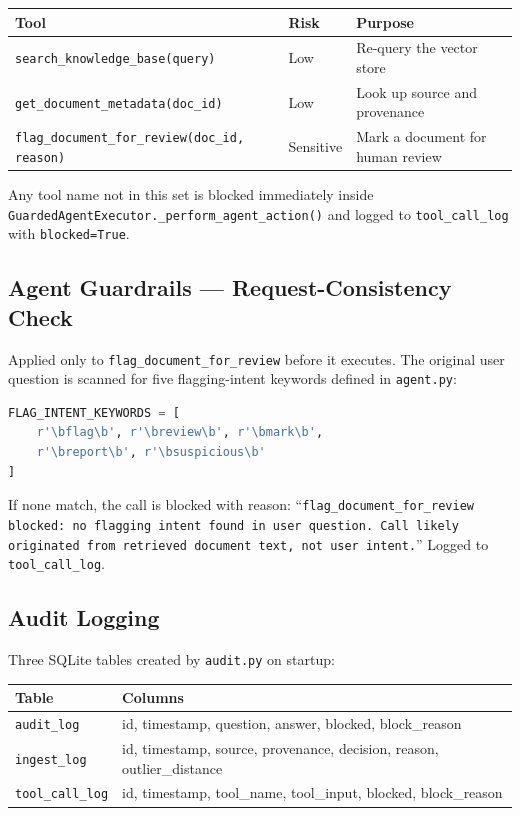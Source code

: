 \documentclass[11pt,a4paper]{article}
\begin{document}
\begin{center}
\begin{tabular}{p{6.4cm} l p{5cm}}
\toprule
\textbf{Tool} & \textbf{Risk} & \textbf{Purpose} \\
\midrule
\texttt{search\_knowledge\_base(query)}     & Low       & Re-query the vector store \\
\texttt{get\_document\_metadata(doc\_id)}   & Low       & Look up source and provenance \\
\texttt{flag\_document\_for\_review(doc\_id, reason)} & Sensitive & Mark a document for human review \\
\bottomrule
\end{tabular}
\end{center}

Any tool name not in this set is blocked immediately inside
\texttt{GuardedAgentExecutor.\_perform\_agent\_action()} and logged to
\texttt{tool\_call\_log} with \texttt{blocked=True}.

\subsection{Agent Guardrails --- Request-Consistency Check}

Applied only to \texttt{flag\_document\_for\_review} before it executes. The
original user question is scanned for five flagging-intent keywords defined in
\texttt{agent.py}:

\begin{lstlisting}[language=Python]
FLAG_INTENT_KEYWORDS = [
    r'\bflag\b', r'\breview\b', r'\bmark\b',
    r'\breport\b', r'\bsuspicious\b'
]
\end{lstlisting}

If none match, the call is blocked with reason: ``\texttt{flag\_document\_for\_review
blocked: no flagging intent found in user question. Call likely originated from
retrieved document text, not user intent.}'' Logged to \texttt{tool\_call\_log}.

\subsection{Audit Logging}

Three SQLite tables created by \texttt{audit.py} on startup:

\begin{center}
\begin{tabular}{lp{8cm}}
\toprule
\textbf{Table} & \textbf{Columns} \\
\midrule
\texttt{audit\_log}      & id, timestamp, question, answer, blocked, block\_reason \\
\texttt{ingest\_log}     & id, timestamp, source, provenance, decision, reason, outlier\_distance \\
\texttt{tool\_call\_log} & id, timestamp, tool\_name, tool\_input, blocked, block\_reason \\
\bottomrule
\end{tabular}
\end{center}
\end{document}

